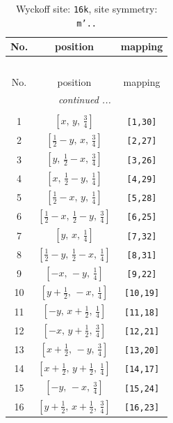 \documentclass[fleqn,8pt]{jsarticle}
\begin{document}
\renewcommand{\arraystretch}{1.2}
\begin{longtable}{ccc}
\caption{Wyckoff site: {\tt 16k}, site symmetry: {\tt m'..}}
 \\
 \hline \hline
No. & position & mapping \\ \hline \endfirsthead

\multicolumn{2}{l}{\tablename\ \thetable{}} \\
 \hline \hline
No. & position & mapping \\ \hline \endhead

 \hline \hline
\multicolumn{2}{r}{\footnotesize\it continued ...} \\ \endfoot

 \hline \hline
\multicolumn{2}{r}{} \\ \endlastfoot

1 & $\left[ x,\, y,\, \frac{3}{4} \right]$ & {\tt [1,30]} \\ \hline
2 & $\left[ \frac{1}{2} - y,\, x,\, \frac{3}{4} \right]$ & {\tt [2,27]} \\ \hline
3 & $\left[ y,\, \frac{1}{2} - x,\, \frac{3}{4} \right]$ & {\tt [3,26]} \\ \hline
4 & $\left[ x,\, \frac{1}{2} - y,\, \frac{1}{4} \right]$ & {\tt [4,29]} \\ \hline
5 & $\left[ \frac{1}{2} - x,\, y,\, \frac{1}{4} \right]$ & {\tt [5,28]} \\ \hline
6 & $\left[ \frac{1}{2} - x,\, \frac{1}{2} - y,\, \frac{3}{4} \right]$ & {\tt [6,25]} \\ \hline
7 & $\left[ y,\, x,\, \frac{1}{4} \right]$ & {\tt [7,32]} \\ \hline
8 & $\left[ \frac{1}{2} - y,\, \frac{1}{2} - x,\, \frac{1}{4} \right]$ & {\tt [8,31]} \\ \hline
9 & $\left[ - x,\, - y,\, \frac{1}{4} \right]$ & {\tt [9,22]} \\ \hline
10 & $\left[ y + \frac{1}{2},\, - x,\, \frac{1}{4} \right]$ & {\tt [10,19]} \\ \hline
11 & $\left[ - y,\, x + \frac{1}{2},\, \frac{1}{4} \right]$ & {\tt [11,18]} \\ \hline
12 & $\left[ - x,\, y + \frac{1}{2},\, \frac{3}{4} \right]$ & {\tt [12,21]} \\ \hline
13 & $\left[ x + \frac{1}{2},\, - y,\, \frac{3}{4} \right]$ & {\tt [13,20]} \\ \hline
14 & $\left[ x + \frac{1}{2},\, y + \frac{1}{2},\, \frac{1}{4} \right]$ & {\tt [14,17]} \\ \hline
15 & $\left[ - y,\, - x,\, \frac{3}{4} \right]$ & {\tt [15,24]} \\ \hline
16 & $\left[ y + \frac{1}{2},\, x + \frac{1}{2},\, \frac{3}{4} \right]$ & {\tt [16,23]} \\
\end{longtable}
\end{document}
